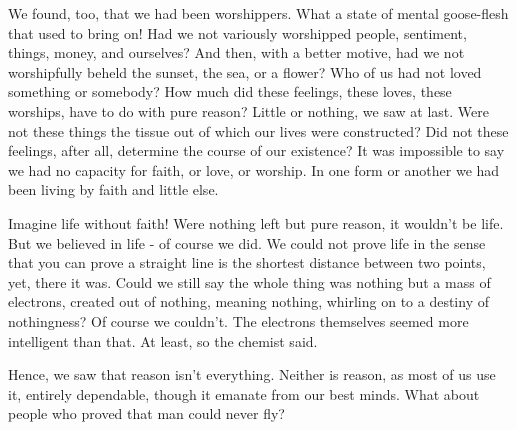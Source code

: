 \begin{biblechapter}
    We found, too, that we had been worshippers. 
What a state of mental goose-flesh that used to bring on! 
Had we not variously worshipped people, sentiment, things, money, and ourselves? 
And then, with a better motive, had we not worshipfully beheld the sunset, the sea, or a flower? 
Who of us had not loved something or somebody? 
How much did these feelings, these loves, these worships, have to do with pure reason? 
Little or nothing, we saw at last. 
Were not these things the tissue out of which our lives were constructed? 
Did not these feelings, after all, determine the course of our existence? 
It was impossible to say we had no capacity for faith, or love, or worship. 
In one form or another we had been living by faith and little else.

Imagine life without faith! 
Were nothing left but pure reason, it wouldn't be life. 
But we believed in life - of course we did. 
We could not prove life in the sense that 
you can prove a straight line is the shortest distance between two points, yet, there it was. 
Could we still say the whole thing was nothing but a mass of electrons, 
created out of nothing, meaning nothing, 
whirling on to a destiny of nothingness? 
Of course we couldn't. 
The electrons themselves seemed more intelligent than that. 
At least, so the chemist said.

Hence, we saw that reason isn't everything. 
Neither is reason, as most of us use it, entirely dependable, 
though it emanate from our best minds. 
What about people who proved that man could never fly?
\end{biblechapter}


